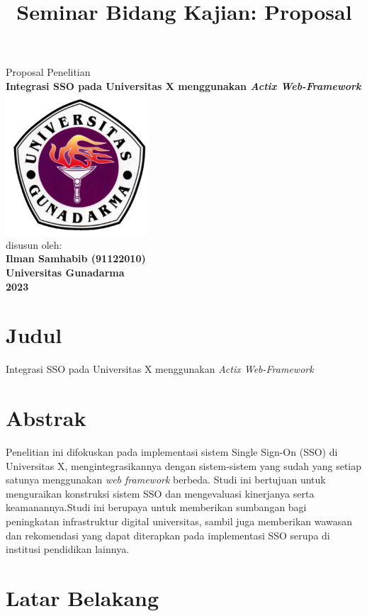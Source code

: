 \documentclass[12pt]{article}
\title{Seminar Bidang Kajian: Proposal }
\begin{document}
\thispagestyle{empty}
\begin{center}
    Proposal Penelitian\\
    \textbf{Integrasi SSO pada Universitas X menggunakan \emph{Actix Web-Framework} }\\
    \vspace*{11\baselineskip}
    \includegraphics[width=0.4\textwidth,height=0.4\textwidth]{glogo}  \\
    \vspace*{11\baselineskip}
    disusun oleh:\\
    \textbf{Ilman Samhabib (91122010)}\\
    \textbf{Universitas Gunadarma}\\
    \textbf{2023}\\
\end{center}
\newpage
\section*{Judul}
Integrasi SSO pada Universitas X menggunakan \emph{Actix Web-Framework}
\section*{Abstrak}
Penelitian ini difokuskan pada implementasi sistem Single Sign-On (SSO) di Universitas X, mengintegrasikannya dengan sistem-sistem yang sudah yang setiap satunya menggunakan \emph{web framework} berbeda. Studi ini bertujuan untuk menguraikan konstruksi sistem SSO dan mengevaluasi kinerjanya serta keamanannya.Studi ini berupaya untuk memberikan sumbangan bagi peningkatan infrastruktur digital universitas, sambil juga memberikan wawasan dan rekomendasi yang dapat diterapkan pada implementasi SSO serupa di institusi pendidikan lainnya.

\section{Latar Belakang}
\end{document}
